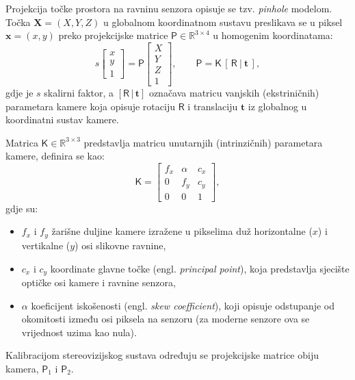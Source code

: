Projekcija točke prostora na ravninu senzora opisuje se tzv. \textit{pinhole} modelom.
Točka $\mathbf{X}=(X,Y,Z)$ u globalnom koordinatnom sustavu
preslikava se u piksel $\mathbf{x}=(x,y)$ preko projekcijske matrice
$\mathsf{P}\in\mathbb{R}^{3\times4}$ u homogenim koordinatama:
\begin{equation}
  s\begin{bmatrix} x \\ y \\ 1 \end{bmatrix}
  = \mathsf{P}\begin{bmatrix} X \\ Y \\ Z \\ 1 \end{bmatrix},
  \qquad
  \mathsf{P} = \mathsf{K}\,[\,\mathsf{R}\ |\ \mathbf{t}\,],
  \label{eq:projection}
\end{equation}
gdje je $s$ skalirni faktor, a $[\mathsf{R}\,|\,\mathbf{t}]$ označava matricu vanjskih (ekstriničnih) parametara kamere koja opisuje rotaciju $\mathsf{R}$ i translaciju $\mathbf{t}$ iz globalnog u koordinatni sustav kamere.

Matrica $\mathsf{K}\in\mathbb{R}^{3\times3}$ predstavlja matricu unutarnjih (intrinzičnih)
parametara kamere, definira se kao:
\begin{equation}
  \mathsf{K} = \begin{bmatrix} f_x & \alpha & c_x \\ 0 & f_y & c_y \\ 0 & 0 & 1 \end{bmatrix},
  \label{eq:intrinsic-matrix}
\end{equation}
gdje su:
\begin{itemize}
  \item $f_x$ i $f_y$ žarišne duljine kamere izražene u pikselima duž horizontalne ($x$) i vertikalne ($y$) osi slikovne ravnine,
  \item $c_x$ i $c_y$ koordinate glavne točke (engl. \textit{principal point}), koja predstavlja sjecište optičke osi kamere i ravnine senzora,
  \item $\alpha$ koeficijent iskošenosti (engl. \textit{skew coefficient}), koji opisuje odstupanje od okomitosti između osi piksela na senzoru (za moderne senzore ova se vrijednost uzima kao nula).
\end{itemize}
Kalibracijom stereovizijskog sustava određuju se projekcijske matrice obiju kamera, $\mathsf{P}_1$ i $\mathsf{P}_2$.


